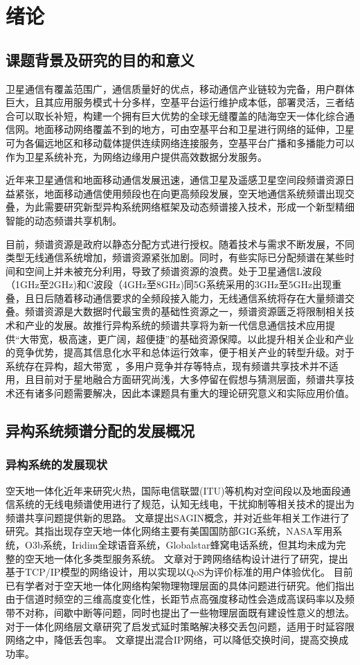 \chapter{绪论}
\section{课题背景及研究的目的和意义}
卫星通信有覆盖范围广，通信质量好的优点，移动通信产业链较为完备，用户群体巨大，且其应用服务模式十分多样，空基平台运行维护成本低，部署灵活，三者结合可以取长补短，构建一个拥有巨大优势的全球无缝覆盖的陆海空天一体化综合通信网。地面移动网络覆盖不到的地方，可由空基平台和卫星进行网络的延伸，卫星可为各偏远地区和移动载体提供连续网络连接服务，空基平台广播和多播能力可以作为卫星系统补充，为网络边缘用户提供高效数据分发服务。

近年来卫星通信和地面移动通信发展迅速，通信卫星及遥感卫星空间段频谱资源日益紧张，地面移动通信使用频段也在向更高频段发展，空天地通信系统频谱出现交叠，为此需要研究新型异构系统网络框架及动态频谱接入技术，形成一个新型精细智能的动态频谱共享机制。

目前，频谱资源是政府以静态分配方式进行授权。随着技术与需求不断发展，不同类型无线通信系统增加，频谱资源紧张加剧。同时，有些实际已分配频谱在某些时间和空间上并未被充分利用，导致了频谱资源的浪费。处于卫星通信L波段（1GHz至2GHz)和C波段（4GHz至8GHz)同5G系统采用的3GHz至5GHz出现重叠，且日后随着移动通信要求的全频段接入能力，无线通信系统将存在大量频谱交叠。频谱资源是大数据时代最宝贵的基础性资源之一，频谱资源匮乏将限制相关技术和产业的发展。故推行异构系统的频谱共享将为新一代信息通信技术应用提供“大带宽，极高速，更广阔，超便捷”的基础资源保障。以此提升相关企业和产业的竞争优势，提高其信息化水平和总体运行效率，便于相关产业的转型升级。对于系统存在异构，超大带宽 ，多用户竞争并存等特点，现有频谱共享技术并不适用，且目前对于星地融合方面研究尚浅，大多停留在假想与猜测层面，频谱共享技术还有诸多问题需要解决，因此本课题具有重大的理论研究意义和实际应用价值。

\section{异构系统频谱分配的发展概况}
\subsection{异构系统的发展现状}

空天地一体化近年来研究火热，国际电信联盟(ITU)等机构对空间段以及地面段通信系统的无线电频谱使用进行了规范，认知无线电，干扰抑制等相关技术的提出为频谱共享问题提供新的思路。
文章\cite{8368236}提出SAGIN概念，并对近些年相关工作进行了研究。其指出现存空天地一体化网络主要有美国国防部GIG系统，NASA军用系统，O3b系统，Iridim全球语音系统，Globalstar蜂窝电话系统，但其均未成为完整的空天地一体化多类型服务系统。
文章\cite{6587995}对于跨网络结构设计进行了研究，提出基于TCP/IP模型的网络设计，用以实现以QoS为评价标准的用户体验优化。
目前已有学者对于空天地一体化网络构架物理物理层面的具体问题进行研究\cite{7879675}。他们指出由于信道时频空的三维高度变化性，长距节点高强度移动性会造成高误码率以及频带不对称，间歇中断等问题，同时也提出了一些物理层面既有建设性意义的想法。
对于一体化网络层文章\cite{8116396}研究了启发式延时策略解决移交丢包问题，适用于时延容限网络之中，降低丢包率。
文章\cite{7925019}提出混合IP网络，可以降低交换时间，提高交换成功率。



